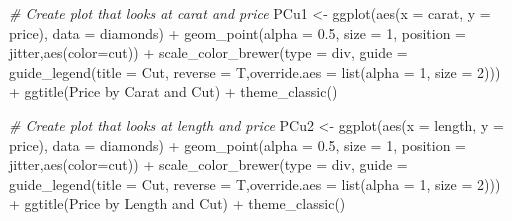 \documentclass[
]{article}
\newenvironment{Shaded}{\begin{snugshade}}{\end{snugshade}}
\newcommand{\AttributeTok}[1]{\textcolor[rgb]{0.77,0.63,0.00}{#1}}
\newcommand{\CommentTok}[1]{\textcolor[rgb]{0.56,0.35,0.01}{\textit{#1}}}
\newcommand{\DecValTok}[1]{\textcolor[rgb]{0.00,0.00,0.81}{#1}}
\newcommand{\FloatTok}[1]{\textcolor[rgb]{0.00,0.00,0.81}{#1}}
\newcommand{\FunctionTok}[1]{\textcolor[rgb]{0.00,0.00,0.00}{#1}}
\newcommand{\NormalTok}[1]{#1}
\newcommand{\OtherTok}[1]{\textcolor[rgb]{0.56,0.35,0.01}{#1}}
\newcommand{\SpecialCharTok}[1]{\textcolor[rgb]{0.00,0.00,0.00}{#1}}
\newcommand{\StringTok}[1]{\textcolor[rgb]{0.31,0.60,0.02}{#1}}
\begin{document}
\begin{Shaded}
\begin{Highlighting}[]
\CommentTok{\# Create plot that looks at carat and price}
\NormalTok{PCu1 }\OtherTok{\textless{}{-}} \FunctionTok{ggplot}\NormalTok{(}\FunctionTok{aes}\NormalTok{(}\AttributeTok{x =}\NormalTok{ carat, }\AttributeTok{y =}\NormalTok{ price), }\AttributeTok{data =}\NormalTok{ diamonds) }\SpecialCharTok{+} \FunctionTok{geom\_point}\NormalTok{(}\AttributeTok{alpha =} \FloatTok{0.5}\NormalTok{, }\AttributeTok{size =} \DecValTok{1}\NormalTok{, }\AttributeTok{position =} \StringTok{\textquotesingle{}jitter\textquotesingle{}}\NormalTok{,}\FunctionTok{aes}\NormalTok{(}\AttributeTok{color=}\NormalTok{cut)) }\SpecialCharTok{+}
  \FunctionTok{scale\_color\_brewer}\NormalTok{(}\AttributeTok{type =} \StringTok{\textquotesingle{}div\textquotesingle{}}\NormalTok{, }\AttributeTok{guide =} \FunctionTok{guide\_legend}\NormalTok{(}\AttributeTok{title =} \StringTok{\textquotesingle{}Cut\textquotesingle{}}\NormalTok{, }\AttributeTok{reverse =}\NormalTok{ T,}\AttributeTok{override.aes =} \FunctionTok{list}\NormalTok{(}\AttributeTok{alpha =} \DecValTok{1}\NormalTok{, }\AttributeTok{size =} \DecValTok{2}\NormalTok{)))       }\SpecialCharTok{+} \FunctionTok{ggtitle}\NormalTok{(}\StringTok{\textquotesingle{}Price by Carat and Cut\textquotesingle{}}\NormalTok{) }\SpecialCharTok{+} \FunctionTok{theme\_classic}\NormalTok{()}

\CommentTok{\# Create plot that looks at length and price}
\NormalTok{PCu2 }\OtherTok{\textless{}{-}} \FunctionTok{ggplot}\NormalTok{(}\FunctionTok{aes}\NormalTok{(}\AttributeTok{x =}\NormalTok{ length, }\AttributeTok{y =}\NormalTok{ price), }\AttributeTok{data =}\NormalTok{ diamonds) }\SpecialCharTok{+} \FunctionTok{geom\_point}\NormalTok{(}\AttributeTok{alpha =} \FloatTok{0.5}\NormalTok{, }\AttributeTok{size =} \DecValTok{1}\NormalTok{, }\AttributeTok{position =} \StringTok{\textquotesingle{}jitter\textquotesingle{}}\NormalTok{,}\FunctionTok{aes}\NormalTok{(}\AttributeTok{color=}\NormalTok{cut)) }\SpecialCharTok{+}
  \FunctionTok{scale\_color\_brewer}\NormalTok{(}\AttributeTok{type =} \StringTok{\textquotesingle{}div\textquotesingle{}}\NormalTok{, }\AttributeTok{guide =} \FunctionTok{guide\_legend}\NormalTok{(}\AttributeTok{title =} \StringTok{\textquotesingle{}Cut\textquotesingle{}}\NormalTok{, }\AttributeTok{reverse =}\NormalTok{ T,}\AttributeTok{override.aes =} \FunctionTok{list}\NormalTok{(}\AttributeTok{alpha =} \DecValTok{1}\NormalTok{, }\AttributeTok{size =} \DecValTok{2}\NormalTok{)))       }\SpecialCharTok{+} \FunctionTok{ggtitle}\NormalTok{(}\StringTok{\textquotesingle{}Price by Length and Cut\textquotesingle{}}\NormalTok{) }\SpecialCharTok{+} \FunctionTok{theme\_classic}\NormalTok{()}


\end{Highlighting}
\end{Shaded}
\end{document}

